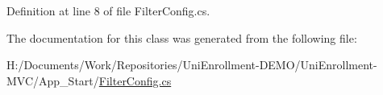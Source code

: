 Definition at line 8 of file Filter\+Config.\+cs.



The documentation for this class was generated from the following file\+:\begin{DoxyCompactItemize}
\item 
H\+:/\+Documents/\+Work/\+Repositories/\+Uni\+Enrollment-\/\+D\+E\+M\+O/\+Uni\+Enrollment-\/\+M\+V\+C/\+App\+\_\+\+Start/\hyperlink{_filter_config_8cs}{Filter\+Config.\+cs}\end{DoxyCompactItemize}
